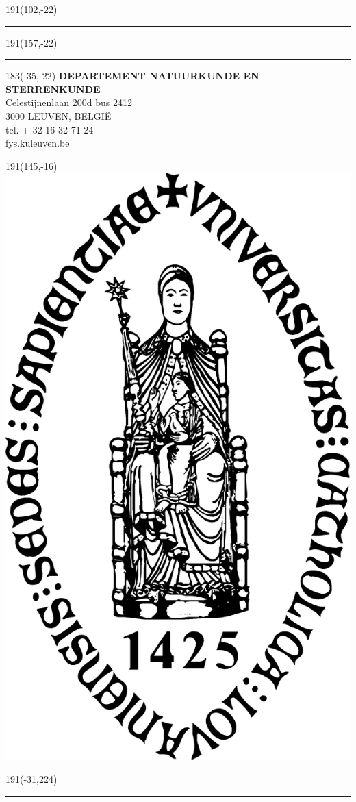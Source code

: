 

\thispagestyle{empty}
\sffamily
%
\begin{textblock}{191}(102,-22)
{\color{blueline}\rule{160pt}{5.5pt}}
\end{textblock}
%
\begin{textblock}{191}(157,-22)
{\color{blueline}\rule{5.5pt}{59pt}}
\end{textblock}
%
\begin{textblock}{183}(-35,-22)
\textblockcolour{}
\flushright
\fontsize{7}{7.5}\selectfont
\textbf{DEPARTEMENT NATUURKUNDE EN STERRENKUNDE}\\
Celestijnenlaan 200d bus 2412\\
3000 LEUVEN, BELGI\"{E}\\
tel. + 32 16 32 71 24\\
fys.kuleuven.be\\
\end{textblock}
%
\begin{textblock}{191}(145,-16)
\textblockcolour{}
\includegraphics*[height=16.5truemm]{Figures/sedes}
\end{textblock}
%
\begin{textblock}{191}(-31,224)
{\color{bluetitle}\rule{544pt}{55pt}}
\end{textblock}
